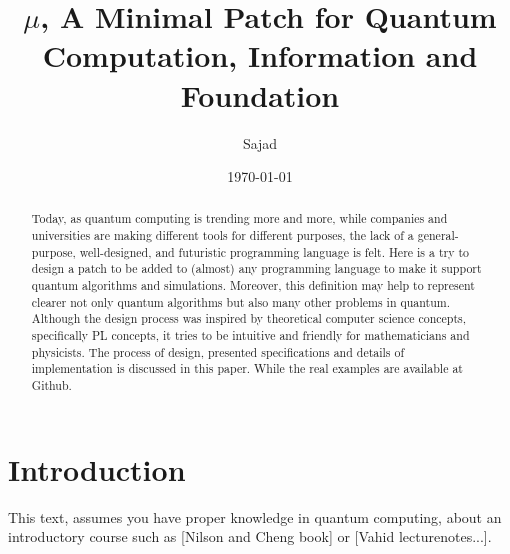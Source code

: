 \documentclass[a4paper,11pt]{article}
\title{$\mu$, A Minimal Patch for Quantum Computation, Information and Foundation}
\author{Sajad}
\date{\today}
\begin{document}
\maketitle


\begin{abstract}
Today, as quantum computing is trending more and more, while companies and universities are making different tools for different purposes, the lack of a general-purpose, well-designed, and futuristic programming language is felt. 
Here is a try to design a patch to be added to (almost) any programming language to make it support quantum algorithms and simulations. Moreover, this definition may help to represent clearer not only quantum algorithms but also many other problems in quantum.
Although the design process was inspired by theoretical computer science concepts, specifically PL concepts, it tries to be intuitive and friendly for mathematicians and physicists.
The process of design, presented specifications and details of implementation is discussed in this paper. While the real examples are available at Github.
\end{abstract}
\clearpage

\tableofcontents
\clearpage

\section{Introduction}

This text, assumes you have proper knowledge in quantum computing, about an introductory course such as [Nilson and Cheng book] or [Vahid lecturenotes...].
\end{document}
